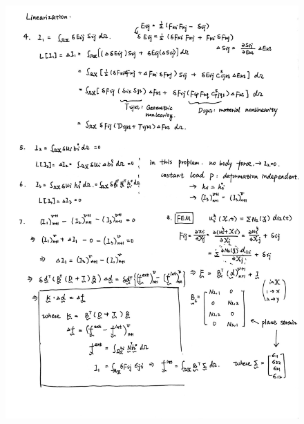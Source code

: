 \documentclass{article}
\begin{document}
\begin{figure}[H]
	\centering
	\includegraphics[scale=0.23]{MAE232C_FINAL_PROJECT_latex/formulation_2.jpg}
\end{figure}
\end{document}
